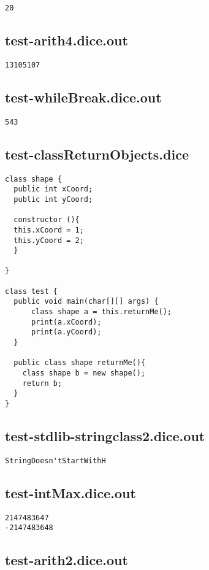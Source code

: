 \begin{verbatim}
20
\end{verbatim}\pagebreak\subsection{test-arith4.dice.out}
\begin{verbatim}
13105107
\end{verbatim}\pagebreak\subsection{test-whileBreak.dice.out}
\begin{verbatim}
543
\end{verbatim}\pagebreak\subsection{test-classReturnObjects.dice}
\begin{verbatim}
class shape {
  public int xCoord;
  public int yCoord;

  constructor (){
  this.xCoord = 1;
  this.yCoord = 2;
  }

}

class test {
  public void main(char[][] args) {
      class shape a = this.returnMe();
      print(a.xCoord);
      print(a.yCoord);
  }

  public class shape returnMe(){
    class shape b = new shape();
    return b;
  }
}
\end{verbatim}\pagebreak\subsection{test-stdlib-stringclass2.dice.out}
\begin{verbatim}
StringDoesn'tStartWithH
\end{verbatim}\pagebreak\subsection{test-intMax.dice.out}
\begin{verbatim}
2147483647
-2147483648
\end{verbatim}\pagebreak\subsection{test-arith2.dice.out}
